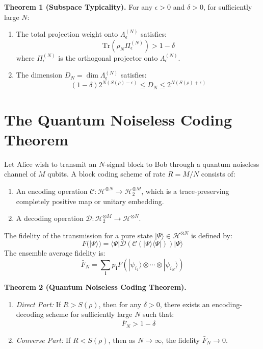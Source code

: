 \documentclass[twocolumn,10pt,letterpaper]{article}
\begin{document}
\noindent \textbf{Theorem 1 (Subspace Typicality).} For any $\epsilon > 0$ and $\delta > 0$, for sufficiently large $N$:
\begin{enumerate}
\item The total projection weight onto $\Lambda_\epsilon^{(N)}$ satisfies:
\begin{equation}
\mathrm{Tr}(\rho_N \Pi_\epsilon^{(N)}) > 1 - \delta
\end{equation}
where $\Pi_\epsilon^{(N)}$ is the orthogonal projector onto $\Lambda_\epsilon^{(N)}$.
\item The dimension $D_N = \dim \Lambda_\epsilon^{(N)}$ satisfies:
\begin{equation}
(1 - \delta) 2^{N(S(\rho) - \epsilon)} \le D_N \le 2^{N(S(\rho) + \epsilon)}
\end{equation}
\end{enumerate}

\section{The Quantum Noiseless Coding Theorem}
Let Alice wish to transmit an $N$-signal block to Bob through a quantum noiseless channel of $M$ qubits. A block coding scheme of rate $R = M/N$ consists of:
\begin{enumerate}
\item An encoding operation $\mathcal{C}: \mathcal{H}^{\otimes N} \to \mathcal{H}_2^{\otimes M}$, which is a trace-preserving completely positive map or unitary embedding.
\item A decoding operation $\mathcal{D}: \mathcal{H}_2^{\otimes M} \to \mathcal{H}^{\otimes N}$.
\end{enumerate}

The fidelity of the transmission for a pure state $|\Psi\rangle \in \mathcal{H}^{\otimes N}$ is defined by:
\begin{equation}
F(|\Psi\rangle) = \langle \Psi | \mathcal{D}(\mathcal{C}(|\Psi\rangle\langle\Psi|)) | \Psi \rangle
\end{equation}
The ensemble average fidelity is:
\begin{equation}
\bar{F}_N = \sum_{\mathbf{i}} p_{\mathbf{i}} F(|\psi_{i_1}\rangle \otimes \cdots \otimes |\psi_{i_N}\rangle)
\end{equation}

\noindent \textbf{Theorem 2 (Quantum Noiseless Coding Theorem).}
\begin{enumerate}
\item \textit{Direct Part:} If $R > S(\rho)$, then for any $\delta > 0$, there exists an encoding-decoding scheme for sufficiently large $N$ such that:
\begin{equation}
\bar{F}_N > 1 - \delta
\end{equation}
\item \textit{Converse Part:} If $R < S(\rho)$, then as $N \to \infty$, the fidelity $\bar{F}_N \to 0$.
\end{enumerate}
\end{document}
